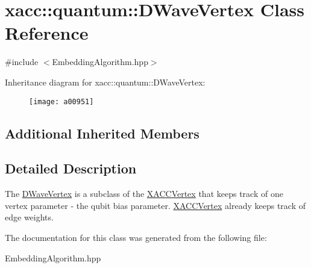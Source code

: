 \hypertarget{a00951}{}\section{xacc\+:\+:quantum\+:\+:D\+Wave\+Vertex Class Reference}
\label{a00951}


{\ttfamily \#include $<$Embedding\+Algorithm.\+hpp$>$}

Inheritance diagram for xacc\+:\+:quantum\+:\+:D\+Wave\+Vertex\+:\begin{figure}[H]
\begin{center}
\leavevmode
\texttt{[image: a00951]}
\end{center}
\end{figure}
\subsection*{Additional Inherited Members}


\subsection{Detailed Description}
The \hyperlink{a00951}{D\+Wave\+Vertex} is a subclass of the \hyperlink{a01175}{X\+A\+C\+C\+Vertex} that keeps track of one vertex parameter -\/ the qubit bias parameter. \hyperlink{a01175}{X\+A\+C\+C\+Vertex} already keeps track of edge weights. 

The documentation for this class was generated from the following file\+:\begin{DoxyCompactItemize}
\item 
Embedding\+Algorithm.\+hpp\end{DoxyCompactItemize}
